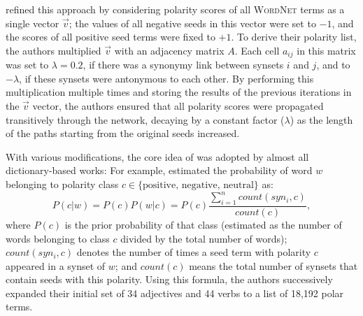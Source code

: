 \citet{Blair-Goldensohn:08} refined this approach by considering
polarity scores of all \textsc{WordNet} terms as a single vector
$\vec{v}$; the values of all negative seeds in this vector were set to
$-1$, and the scores of all positive seed terms were fixed to $+1$.
To derive their polarity list, the authors multiplied $\vec{v}$ with
an adjacency matrix $A$.  Each cell $a_{ij}$ in this matrix was set to
$\lambda=0.2$, if there was a synonymy link between synsets $i$ and
$j$, and to $-\lambda$, if these synsets were antonymous to each
other.  By performing this multiplication multiple times and storing
the results of the previous iterations in the $\vec{v}$ vector, the
authors ensured that all polarity scores were propagated transitively
through the network, decaying by a constant factor ($\lambda$) as the
length of the paths starting from the original seeds increased.


With various modifications, the core idea of \citet{Hu:04} was
adopted by almost all dictionary-based works: For example,
\citet{Kim:04,Kim:06} estimated the probability of word $w$ belonging
to polarity class $c \in \{\textrm{positive, negative, neutral}\}$ as:
\begin{equation*}
  P(c|w) = P(c)P(w|c) = P(c)\frac{\sum\limits_{i=1}^{n}count(syn_i,
    c)}{count(c)},
\end{equation*}
where $P(c)$ is the prior probability of that class (estimated as the
number of words belonging to class $c$ divided by the total number of
words); $count(syn_i, c)$ denotes the number of times a seed term with
polarity $c$ appeared in a synset of $w$; and $count(c)$ means the
total number of synsets that contain seeds with this polarity.  Using
this formula, the authors successively expanded their initial set of
34 adjectives and 44 verbs to a list of 18,192 polar terms.


